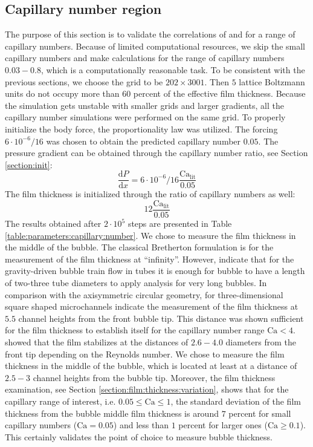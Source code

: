 \documentclass[preprint,12pt]{elsarticle}
\newcommand{\Ca}{\mathrm{Ca}}
\begin{document}
\subsection{Capillary number region}
\label{section:capillary:range}
The purpose of this section is to validate the correlations of
\citet{giavedoni-numerical} %
and
\citet{heil-bretherton} %
for a range of capillary
numbers. Because of limited computational resources, we skip the
small capillary numbers and make calculations for the range of capillary numbers $0.03-0.8$, which
is a computationally reasonable task.  To be consistent with the previous sections, we choose the grid to be
$202 \times 3001$. Then $5$ lattice Boltzmann units do not occupy more than $60$
percent of the effective film thickness. Because the simulation gets unstable with
smaller grids and larger gradients, all the capillary number simulations were
performed on the same grid. To properly initialize the body force, the
proportionality law was utilized. The forcing
$6 \cdot 10^{-6}/16$ was chosen to obtain the predicted capillary
number $0.05$.  
The pressure gradient can be obtained through the capillary number
ratio, see Section \ref{section:init}:
\begin{equation}
\frac{\mathrm{d}P}{\mathrm{d} x}=6 \cdot 10^{-6}/16 \frac{\Ca_{\mathrm{lit}}}{0.05}
\end{equation}
The film thickness is initialized through the ratio of capillary numbers as well:
\begin{equation*}
12 \frac{\Ca_{\mathrm{lit}}}{0.05}
\end{equation*}
The results obtained after $2\cdot10^5$ steps are presented in Table
\ref{table:parameters:capillary:number}. 
{\color{red} We chose to measure the film thickness in the middle of the bubble. The
classical Bretherton formulation is for the measurement of the film thickness at ``infinity''.
However, \citet{cerro-bubble-train} indicate that for the gravity-driven bubble train flow in tubes
it is enough for bubble to have a length of two-three tube diameters to apply analysis for very long
bubbles. In comparison with the axisymmetric circular geometry, for three-dimensional square shaped
microchannels \citet{heil-threedim} indicate the measurement of the film thickness at $5.5$
channel heights from the front bubble tip. This distance was shown sufficient for the
film thickness to establish itself for the capillary number range $\Ca<4$.
\citet{giavedoni-numerical} showed that the film stabilizes at the distances of $2.6-4.0$ diameters
from the front tip depending on the Reynolds number.  We chose to measure the film thickness in the
middle of the bubble, which is located at least at a distance of $2.5-3$ channel heights from the 
bubble tip. Moreover, the film thickness examination, see Section
\ref{section:film:thickness:variation}, shows that for the capillary range of interest, i.e.
$0.05\leq \Ca \leq 1$, the standard deviation of the film thickness from the bubble middle film
thickness is around $7$
percent for small capillary numbers ($\Ca=0.05$) and less than $1$ percent for larger ones ($\Ca
\geq 0.1$). %
This certainly validates the point of choice to measure bubble thickness.}
\end{document}
